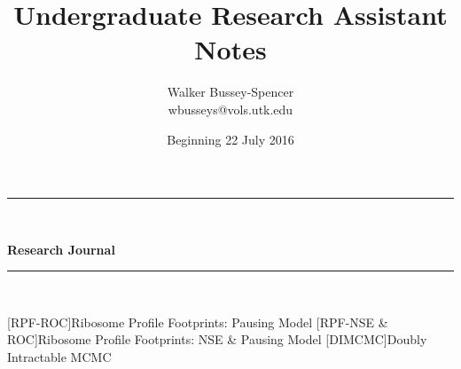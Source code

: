 \documentclass[letterpaper,index=totoc,hyperref,openany]{labbook} %
\newcommand{\HRule}{\rule{\linewidth}{0.5mm}} %
\begin{document}
\frontmatter %
\title{Undergraduate Research Assistant Notes}
\begin{center}
\HRule \\[0.4cm]
{\Huge \bfseries Research Journal \\[0.4cm] %
\HRule \\[1.5cm]}
\end{center}

\author{\LARGE Walker Bussey-Spencer \\ \Large wbusseys@vols.utk.edu \\[2cm]} %
\date{Beginning 22 July 2016} %




[RPF-ROC]{Ribosome Profile Footprints: Pausing Model}
[RPF-NSE \& ROC]{Ribosome Profile Footprints: NSE \& Pausing Model}
[DIMCMC]{Doubly Intractable MCMC}
\end{document}
